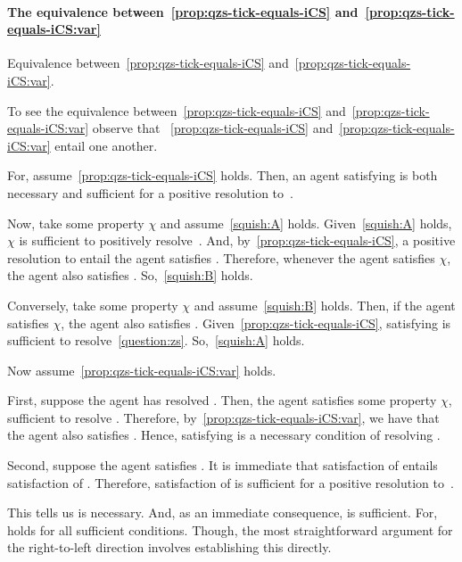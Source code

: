 \paragraph*{The equivalence between~\autoref{prop:qzs-tick-equals-iCS} and~\autoref{prop:qzs-tick-equals-iCS:var}}

\begin{note}
  \begin{proposition}
    Equivalence between~\autoref{prop:qzs-tick-equals-iCS} and~\autoref{prop:qzs-tick-equals-iCS:var}.
  \end{proposition}
\end{note}

\begin{note}
  To see the equivalence between~\autoref{prop:qzs-tick-equals-iCS} and~\autoref{prop:qzs-tick-equals-iCS:var} observe that ~\autoref{prop:qzs-tick-equals-iCS} and~\autoref{prop:qzs-tick-equals-iCS:var} entail one another.

  For, assume~\autoref{prop:qzs-tick-equals-iCS} holds.
  Then, an agent satisfying \izetaS{} is both necessary and sufficient for a positive resolution to~\qzS{}.

  Now, take some property \(\chi\) and assume~\ref{squish:A} holds.
  Given~\ref{squish:A} holds, \(\chi\) is sufficient to positively resolve~\qzS{}.
  And, by~\autoref{prop:qzs-tick-equals-iCS}, a positive resolution to \qzS{} entail the agent satisfies \izetaS{}.
  Therefore, whenever the agent satisfies \(\chi\), the agent also satisfies \izetaS{}.
  So,~\ref{squish:B} holds.

  Conversely, take some property \(\chi\) and assume~\ref{squish:B} holds.
  Then, if the agent satisfies \(\chi\), the agent also satisfies \izetaS{}.
  Given~\autoref{prop:qzs-tick-equals-iCS}, satisfying \izetaS{} is sufficient to resolve~\autoref{question:zs}.
  So,~\ref{squish:A} holds.

  Now assume~\autoref{prop:qzs-tick-equals-iCS:var} holds.

  First, suppose the agent has resolved \qzS{}.
  Then, the agent satisfies some property \(\chi\), sufficient to resolve \qzS{}.
  Therefore, by~\autoref{prop:qzs-tick-equals-iCS:var}, we have that the agent also satisfies \izetaS{}.
  Hence, satisfying \izetaS{} is a necessary condition of resolving \qzS{}.

  Second, suppose the agent satisfies \izetaS{}.
  It is immediate that satisfaction of \izetaS{} entails satisfaction of \izetaS{}.
  Therefore, satisfaction of \izetaS{} is sufficient for a positive resolution to~\qzS{}.

  This tells us \izetaS{} is necessary.
  And, as an immediate consequence, \izetaS{} is sufficient.
  For, holds for all sufficient conditions.
  Though, the most straightforward argument for the right-to-left direction involves establishing this directly.
\end{note}

